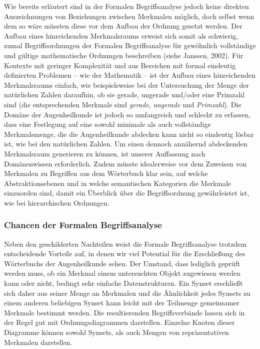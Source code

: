 \documentclass[pagesize,paper=A4,DIV=calc,fontsize=12pt,draft=false]{scrreprt}
\begin{document}
Wie bereits erläutert sind in der Formalen Begriffsanalyse jedoch keine direkten Auszeichnungen von Beziehungen zwischen Merkmalen möglich, doch selbst wenn dem so wäre müssten diese vor dem Aufbau der Ordnung gesetzt werden. 
Der Aufbau eines hinreichenden Merkmalsraums erweist sich somit als schwierig, zumal Begriffsordnungen der Formalen Begriffsanalyse für gewöhnlich vollständige und gültige mathematische Ordnungen beschreiben (siehe Janssen, 2002). 
Für Kontexte mit geringer Komplexität und aus Bereichen mit formal eindeutig definierten Problemen -- wie der Mathematik -- ist der Aufbau eines hinreichenden Merkmalsraums einfach, wie beispielsweise bei der Untersuchung der Menge der natürlichen Zahlen daraufhin, ob sie gerade, ungerade und/oder eine Primzahl sind (die entsprechenden Merkmale sind \textit{gerade}, \textit{ungerade} und \textit{Primzahl}). 
Die Domäne der Augenheilkunde ist jedoch so umfangreich und schlecht zu erfassen, dass eine Festlegung auf eine sowohl minimale als auch vollständige Merkmalsmenge, die die Augenheilkunde abdecken kann nicht so eindeutig lösbar ist, wie bei den natürlichen Zahlen. 
Um einen dennoch annähernd abdeckenden Merkmalsraum generieren zu können, ist unserer Auffassung nach Domänenwissen erforderlich. 
Zudem müsste idealerweise vor dem Zuweisen von Merkmalen zu Begriffen aus dem Wörterbuch klar sein, auf welche Abstraktionsebenen und in welche semantischen Kategorien die Merkmale einzuorden sind, damit ein Überblick über die Begriffsordnung gewährleistet ist, wie bei hierarchischen Ordnungen. 

\subsubsection{Chancen der Formalen Begriffsanalyse}

Neben den geschilderten Nachteilen weist die Formale Begriffsanalyse trotzdem entscheidende Vorteile auf, in denen wir viel Potential für die Erschließung des Wörterbuchs der Augenheilkunde sehen. 
Der Umstand, dass lediglich geprüft werden muss, ob ein Merkmal einem untersuchten Objekt zugewiesen werden kann oder nicht, bedingt sehr einfache Datenstrukturen.
Ein Synset erschließt sich daher aus seiner Menge an Merkmalen und die Ähnlichkeit jedes Synsets zu einem anderen beliebigen Synset kann leicht mit der Teilmenge gemeinsamer Merkmale bestimmt werden.
Die resultierenden Begriffsverbände lassen sich in der Regel gut mit Ordnungsdiagrammen darstellen.
Einzelne Knoten dieser Diagramme können sowohl Synsets, als auch Mengen von repräsentativen Merkmalen darstellen. 
\end{document}

